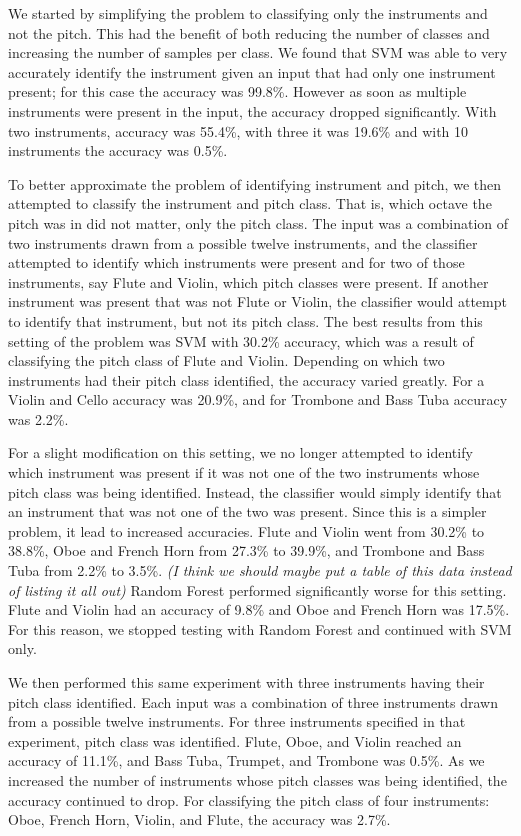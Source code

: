 \documentclass{article}
\begin{document}
We started by simplifying the problem to classifying only the instruments and not the pitch. This had the benefit of both reducing the number of classes and increasing the number of samples per class. We found that SVM was able to very accurately identify the instrument given an input that had only one instrument present; for this case the accuracy was 99.8\%. However as soon as multiple instruments were present in the input, the accuracy dropped significantly. With two instruments, accuracy was 55.4\%, with three it was 19.6\% and with 10 instruments the accuracy was 0.5\%. 

To better approximate the problem of identifying instrument and pitch, we then attempted to classify the instrument and pitch class. That is, which octave the pitch was in did not matter, only the pitch class. The input was a combination of two instruments drawn from a possible twelve instruments, and the classifier attempted to identify which instruments were present and for two of those instruments, say Flute and Violin, which pitch classes were present. If another instrument was present that was not Flute or Violin, the classifier would attempt to identify that instrument, but not its pitch class. The best results from this setting of the problem was SVM with 30.2\% accuracy, which was a result of classifying the pitch class of Flute and Violin. Depending on which two instruments had their pitch class identified, the accuracy varied greatly. For a Violin and Cello accuracy was 20.9\%, and for Trombone and Bass Tuba accuracy was 2.2\%.

For a slight modification on this setting, we no longer attempted to identify which instrument was present if it was not one of the two instruments whose pitch class was being identified. Instead, the classifier would simply identify that an instrument that was not one of the two was present. Since this is a simpler problem, it lead to increased accuracies. Flute and Violin went from 30.2\% to 38.8\%, Oboe and French Horn from 27.3\% to 39.9\%, and Trombone and Bass Tuba from 2.2\% to 3.5\%. \textit{(I think we should maybe put a table of this data instead of listing it all out)} Random Forest performed significantly worse for this setting. Flute and Violin had an accuracy of 9.8\% and Oboe and French Horn was 17.5\%. For this reason, we stopped testing with Random Forest and continued with SVM only.

We then performed this same experiment with three instruments having their pitch class identified. Each input was a combination of three instruments drawn from a possible twelve instruments. For three instruments specified in that experiment, pitch class was identified. Flute, Oboe, and Violin reached an accuracy of 11.1\%, and Bass Tuba, Trumpet, and Trombone was 0.5\%. As we increased the number of instruments whose pitch classes was being identified, the accuracy continued to drop. For classifying the pitch class of four instruments: Oboe, French Horn, Violin, and Flute, the accuracy was 2.7\%.
\end{document}
